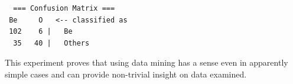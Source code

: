 \begin{lstlisting}
  === Confusion Matrix ===
 Be     O   <-- classified as
 102    6 |   Be
  35   40 |   Others
\end{lstlisting}


This experiment proves that using data mining has a sense even in
apparently simple cases and can provide non-trivial insight on data
examined.






